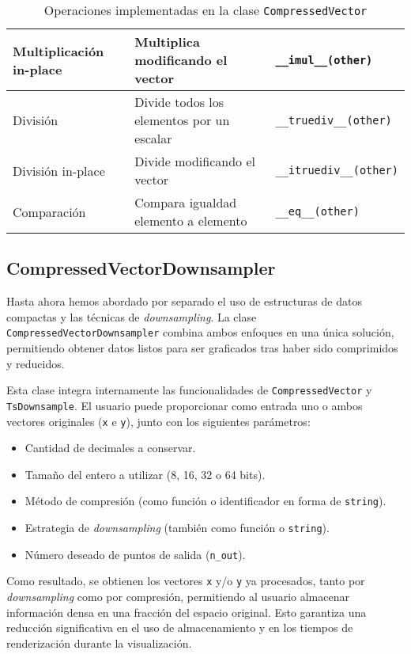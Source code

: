 \begin{table}[H]
\begin{tabular}{|p{3.5cm}|p{6cm}|p{5cm}|}
\hline
\rule{0pt}{1.5em}Multiplicación in-place & Multiplica modificando el vector         & \texttt{\_\_imul\_\_(other)} \\
\hline
\rule{0pt}{1.5em}División           & Divide todos los elementos por un escalar      & \texttt{\_\_truediv\_\_(other)} \\
\hline
\rule{0pt}{1.5em}División in-place  & Divide modificando el vector                   & \texttt{\_\_itruediv\_\_(other)} \\
\hline
\rule{0pt}{1.5em}Comparación        & Compara igualdad elemento a elemento           & \texttt{\_\_eq\_\_(other)} \\
\hline
\end{tabular}
\caption{Operaciones implementadas en la clase \texttt{CompressedVector}}
\end{table}

\subsection{CompressedVectorDownsampler}

Hasta ahora hemos abordado por separado el uso de estructuras de datos compactas y las técnicas de \textit{downsampling}. La clase \texttt{CompressedVectorDownsampler} combina ambos enfoques en una única solución, permitiendo obtener datos listos para ser graficados tras haber sido comprimidos y reducidos.

Esta clase integra internamente las funcionalidades de \texttt{CompressedVector} y \texttt{TsDownsample}. El usuario puede proporcionar como entrada uno o ambos vectores originales (\texttt{x} e \texttt{y}), junto con los siguientes parámetros:

\begin{itemize}
    \item Cantidad de decimales a conservar.
    \item Tamaño del entero a utilizar (8, 16, 32 o 64 bits).
    \item Método de compresión (como función o identificador en forma de \texttt{string}).
    \item Estrategia de \textit{downsampling} (también como función o \texttt{string}).
    \item Número deseado de puntos de salida (\texttt{n\_out}).
\end{itemize}

Como resultado, se obtienen los vectores \texttt{x} y/o \texttt{y} ya procesados, tanto por \textit{downsampling} como por compresión, permitiendo al usuario almacenar información densa en una fracción del espacio original. Esto garantiza una reducción significativa en el uso de almacenamiento y en los tiempos de renderización durante la visualización.



